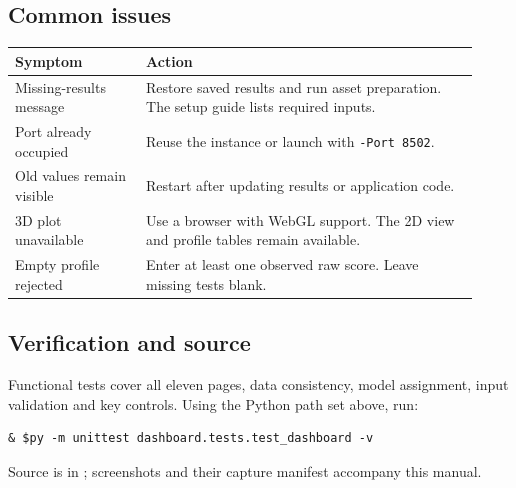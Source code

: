 \documentclass[11pt,a4paper]{article}
\begin{document}
\subsection*{Common issues}
\begin{tabular}{p{0.26\linewidth}p{0.66\linewidth}}
\toprule
\textbf{Symptom} & \textbf{Action}\\
\midrule
Missing-results message & Restore saved results and run asset preparation. The setup guide lists required inputs.\\[0.4em]
Port already occupied & Reuse the instance or launch with \texttt{-Port 8502}.\\[0.4em]
Old values remain visible & Restart after updating results or application code.\\[0.4em]
3D plot unavailable & Use a browser with WebGL support. The 2D view and profile tables remain available.\\[0.4em]
Empty profile rejected & Enter at least one observed raw score. Leave missing tests blank.\\
\bottomrule
\end{tabular}

\subsection*{Verification and source}
Functional tests cover all eleven pages, data consistency, model assignment, input validation and key controls. Using the Python path set above, run:
{\small\begin{verbatim}
& $py -m unittest dashboard.tests.test_dashboard -v
\end{verbatim}}
Source is in ; screenshots and their capture manifest accompany this manual.
\end{document}
